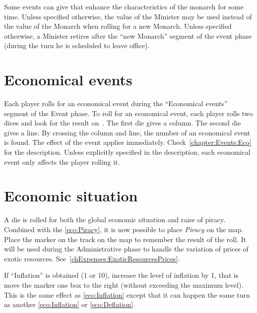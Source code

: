 
\label{chEvents:Excellent Ministers} Some
events can give  that enhance the
characteristics of the monarch for some time.
\bparag Unless specified otherwise, the value of the Minister may be
used instead of the value of the Monarch when rolling for a new Monarch.
\bparag Unless specified otherwise, a Minister retires after the ``new
Monarch'' segment of the event phase (during the turn he is scheduled to
leave office).




\section{Economical events}\label{chEvents:eco-events}

\aparag Each player rolls for an economical event during the
``Economical events'' segment of the Event phase.
\aparag To roll for an economical event, each player rolls two dices and
look for the result on~.
\bparag The first die gives a column. The second die gives a line. By
crossing the column and line, the number of an economical event is
found.
\bparag The effect of the event applies
immediately. Check~\ref{chapter:Events:Eco} for the description.
\aparag Unless explicitly specified in the description, each economical
event only affects the player rolling it.




\section{Economic situation}
\label{chEvents:Economic situation}

 A die is rolled for both the global economic
situation and raise of piracy.
\bparag Combined with the \ref{eco:Piracy}, it is now possible to place
\emph{Piracy} on the map.
\bparag Place the  marker on the track on the
\ROTW map to remember the result of the roll. It will be used during the
Administrative phase to handle the variation of prices of exotic
resources. See~\ref{chExpenses:ExoticResourcesPrices}.

\aparag[Inflation] \label{chEvents:Inflation}
\bparag If ``Inflation'' is obtained (1 or 10), increase the level of
inflation by 1, that is move the marker one box to the right (without
exceeding the maximum level). This is the same effect as
\ref{eco:Inflation} except that it can happen the same turn as another
\ref{eco:Inflation} or \ref{eco:Deflation}.



